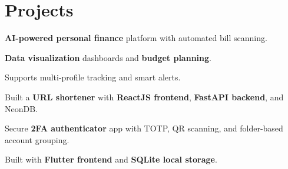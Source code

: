 \documentclass[]{deedy-resume-reversed}
\begin{document}
\begin{minipage}[t]{0.60\textwidth}
\section{Projects}

\begin{tightemize}
\item \textbf{AI-powered personal finance} platform with automated bill scanning.
\item \textbf{Data visualization} dashboards and \textbf{budget planning}.
\item Supports multi-profile tracking and smart alerts.
\end{tightemize}
\sectionsep

\begin{tightemize}
\item Built a \textbf{URL shortener} with \textbf{ReactJS frontend}, \textbf{FastAPI backend}, and NeonDB.
\end{tightemize}
\sectionsep

\begin{tightemize}
\item Secure \textbf{2FA authenticator} app with TOTP, QR scanning, and folder-based account grouping.
\item Built with \textbf{Flutter frontend} and \textbf{SQLite local storage}.
\end{tightemize}
\sectionsep

\end{minipage}
\hfill
\end{document}
